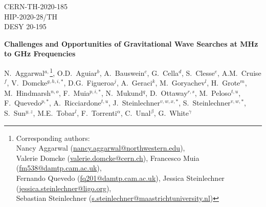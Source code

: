 \documentclass[11pt,a4paper]{article}
\begin{document}
\begin{flushright}
CERN-TH-2020-185\\
HIP-2020-28/TH\\
DESY 20-195
\end{flushright}

\vspace*{2cm}

\begin{center}

\bigskip

{\LARGE\bf  Challenges and Opportunities of Gravitational Wave Searches %
at MHz to GHz Frequencies}

\vskip 1.5cm

\renewcommand*{\thefootnote}{\fnsymbol{footnote}}

{%
\small N.~Aggarwal$^{a,}$\footnote[1]{Corresponding authors:\\ Nancy Aggarwal (\href{mailto:nancy.aggarwal@northwestern.edu}{nancy.aggarwal@northwestern.edu}),\\ Valerie Domcke (\href{mailto:valerie.domcke@cern.ch}{valerie.domcke@cern.ch}), Francesco Muia (\href{mailto:fm538@damtp.cam.ac.uk}{fm538@damtp.cam.ac.uk}),\\ Fernando Quevedo (\href{mailto:fq201@damtp.cam.ac.uk}{fq201@damtp.cam.ac.uk}), Jessica Steinlechner (\href{mailto:jessica.steinlechner@ligo.org}{jessica.steinlechner@ligo.org}),\\
Sebastian Steinlechner (\href{mailto:s.steinlechner@maastrichtuniversity.nl}{s.steinlechner@maastrichtuniversity.nl})},
O.D.~Aguiar$^b$,
A.~Bauswein$^c$,
G.~Cella$^d$,
S.~Clesse$^e$,
A.M.~Cruise$^f$,
V.~Domcke$^{g,h,i,*}$,
D.G.~Figueroa$^j$,
A.~Geraci$^k$,
M.~Goryachev$^l$,
H.~Grote$^m$,
M.~Hindmarsh$^{n, o}$,
F.~Muia$^{p,i,*}$,
N.~Mukund$^q$,
{D.~Ottaway}$^{r, s}$,
{M.~Peloso}$^{t, u}$,
{F.~Quevedo}$^{p, *}$,
{A.~Ricciardone}$^{t, u}$,
{J.~Steinlechner}$^{v,w,x,*}$,
{S.~Steinlechner}$^{v,w,*}$,
{S.~Sun}$^{y, z}$,
{M.E.~Tobar}$^l$,
{F.~Torrenti}$^\alpha$,
{C.~Unal}$^\beta$,
{G.~White$^\gamma$}}\\[15mm]



\end{center}
\end{document}
